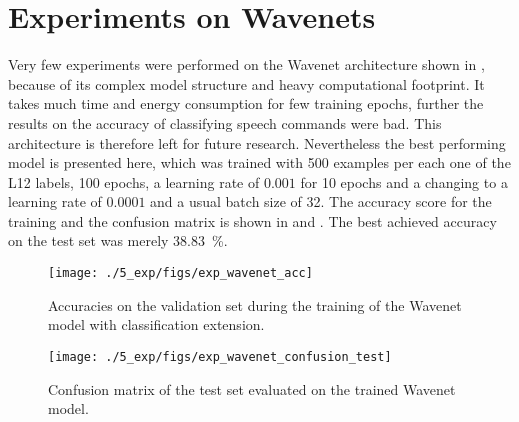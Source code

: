 
\section{Experiments on Wavenets}\label{exp_wavenet}
\thesisStateReady
Very few experiments were performed on the Wavenet architecture shown in , because of its complex model structure and heavy computational footprint.
It takes much time and energy consumption for few training epochs, further the results on the accuracy of classifying speech commands were bad.
This architecture is therefore left for future research.
Nevertheless the best performing model is presented here, which was trained with 500 examples per each one of the L12 labels, 100 epochs, a learning rate of $0.001$ for 10 epochs and a changing to a learning rate of $0.0001$ and a usual batch size of 32.
The accuracy score for the training and the confusion matrix is shown in  and .
The best achieved accuracy on the test set was merely \SI{38.83}{\percent}.
\begin{figure}[!ht]
  \centering
  \texttt{[image: ./5\_exp/figs/exp\_wavenet\_acc]}
  \caption{Accuracies on the validation set during the training of the Wavenet model with classification extension.}
  \label{fig:exp_wavenet_acc}
\end{figure}
\begin{figure}[!ht]
  \centering
  \texttt{[image: ./5\_exp/figs/exp\_wavenet\_confusion\_test]}
  \caption{Confusion matrix of the test set evaluated on the trained Wavenet model.}
  \label{fig:exp_wavenet_confusion}
\end{figure}
\FloatBarrier
\noindent